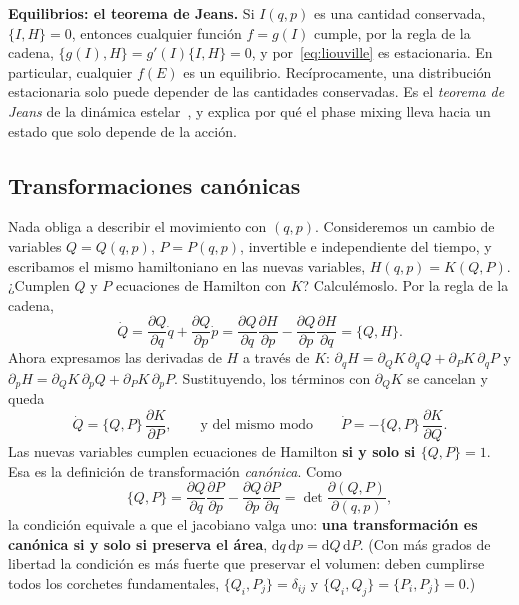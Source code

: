 \documentclass[11pt,a4paper]{article}
\newcommand{\dd}{\mathrm{d}}
\theoremstyle{definition}
\begin{document}
\begin{idea}
\textbf{Equilibrios: el teorema de Jeans.} Si $I(q,p)$ es una cantidad conservada,
$\{I,H\}=0$, entonces cualquier función $f=g(I)$ cumple, por la regla de la cadena,
$\{g(I),H\}=g'(I)\{I,H\}=0$, y por~\eqref{eq:liouville} es estacionaria. En
particular, cualquier $f(E)$ es un equilibrio. Recíprocamente, una distribución
estacionaria solo puede depender de las cantidades conservadas. Es el \emph{teorema
de Jeans} de la dinámica estelar~\cite[\S4.2]{binney2008}, y explica por qué el
phase mixing lleva hacia un estado que solo depende de la acción.
\end{idea}

\subsection{Transformaciones canónicas}

Nada obliga a describir el movimiento con $(q,p)$. Consideremos un cambio de
variables $Q=Q(q,p)$, $P=P(q,p)$, invertible e independiente del tiempo, y escribamos
el mismo hamiltoniano en las nuevas variables, $H(q,p)=K(Q,P)$. ¿Cumplen $Q$ y $P$
ecuaciones de Hamilton con $K$? Calculémoslo. Por la regla de la cadena,
\begin{equation}
  \dot Q = \frac{\partial Q}{\partial q}\dot q + \frac{\partial Q}{\partial p}\dot p
         = \frac{\partial Q}{\partial q}\frac{\partial H}{\partial p}
          -\frac{\partial Q}{\partial p}\frac{\partial H}{\partial q}
         = \{Q,H\} .
\end{equation}
Ahora expresamos las derivadas de $H$ a través de $K$:
$\partial_qH=\partial_QK\,\partial_qQ+\partial_PK\,\partial_qP$ y
$\partial_pH=\partial_QK\,\partial_pQ+\partial_PK\,\partial_pP$. Sustituyendo, los
términos con $\partial_QK$ se cancelan y queda
\begin{equation}
  \dot Q = \{Q,P\}\,\frac{\partial K}{\partial P},
  \qquad\text{y del mismo modo}\qquad
  \dot P = -\{Q,P\}\,\frac{\partial K}{\partial Q} .
\end{equation}
Las nuevas variables cumplen ecuaciones de Hamilton \textbf{si y solo si
$\{Q,P\}=1$}. Esa es la definición de transformación \emph{canónica}. Como
\begin{equation}
  \{Q,P\}
  = \frac{\partial Q}{\partial q}\frac{\partial P}{\partial p}
   -\frac{\partial Q}{\partial p}\frac{\partial P}{\partial q}
  = \det\frac{\partial(Q,P)}{\partial(q,p)} ,
\end{equation}
la condición equivale a que el jacobiano valga uno: \textbf{una transformación es
canónica si y solo si preserva el área}, $\dd q\,\dd p=\dd Q\,\dd P$. (Con más grados
de libertad la condición es más fuerte que preservar el volumen: deben cumplirse
todos los corchetes fundamentales, $\{Q_i,P_j\}=\delta_{ij}$ y
$\{Q_i,Q_j\}=\{P_i,P_j\}=0$.)
\end{document}
